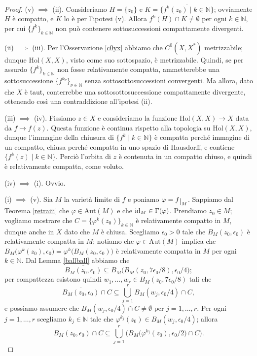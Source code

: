 \begin{proof}
    (v) $\implies$ (ii). Consideriamo $H=\{z_0\}$ e $K=\overline{\{f^k(z_0)\mid k\in\mathbb{N}\}}$; ovviamente $H$ è compatto, e $K$ lo è per l'ipotesi (v). Allora $f^k(H)\cap K\not=\emptyset$ per ogni $k\in\mathbb{N}$, per cui $\{f^k\}_{k \in \mathbb{N}}$ non può contenere sottosuccessioni compattamente divergenti.

    (ii) $\implies$ (iii). Per l'Osservazione \ref{c0yx} abbiamo che $C^0(X,X^*)$ metrizzabile; dunque $\text{Hol}(X,X)$, visto come suo sottospazio, è metrizzabile. Quindi, se per assurdo $\{f^k\}_{k \in \mathbb{N}}$ non fosse relativamente compatta, ammetterebbe una sottosuccessione $\{f^{k_\nu}\}_{\nu\in\mathbb{N}}$ senza sottosottosuccessioni convergenti. Ma allora, dato che $X$ è taut, conterrebbe una sottosottosuccessione compattamente divergente, ottenendo così una contraddizione all'ipotesi (ii).

    (iii) $\implies$ (iv). Fissiamo $z\in X$ e consideriamo la funzione $\text{Hol}(X,X)\longrightarrow X$ data da $f\longmapsto f(z)$. Questa funzione è continua rispetto alla topologia su $\text{Hol}(X,X)$, dunque l'immagine della chiusura di $\{f^k\mid k\in\mathbb{N}\}$ è compatta perché immagine di un compatto, chiusa perché compatta in uno spazio di Hausdorff, e contiene $\{f^k(z)\mid k\in\mathbb{N}\}$. Perciò l'orbita di $z$ è contenuta in un compatto chiuso, e quindi è relativamente compatta, come voluto.

    (iv) $\implies$ (i). Ovvio.

    (i) $\implies$ (v). Sia $M$ la varietà limite di $f$ e poniamo $\varphi=f\restrict{M}$. Sappiamo dal Teorema \ref{retraiii} che $\varphi\in\text{Aut}(M)$ e che $\operatorname{id}_M\in\Gamma(\varphi)$. Prendiamo $z_0 \in M$; vogliamo mostrare che $C=\{\varphi^k(z_0)\}_{k\in\mathbb{N}}$ è relativamente compatto in $M$, dunque anche in $X$ dato che $M$ è chiusa. Scegliamo $\epsilon_0>0$ tale che $B_M(z_0,\epsilon_0)$ è relativamente compatta in $M$; notiamo che $\varphi\in\text{Aut}(M)$ implica che $B_M\big(\varphi^k(z_0),\epsilon_0\big)=\varphi^k\big(B_M(z_0,\epsilon_0)\big)$ è relativamente compatta in $M$ per ogni $k \in \mathbb{N}$. Dal Lemma \ref{ballball} abbiamo che
    $$\overline{B_M(z_0,\epsilon_0)} \subseteq B_M\big(B_M(z_0,7\epsilon_0/8),\epsilon_0/4\big);$$
    per compattezza esistono quindi $w_1,\dots,w_r \in B_M(z_0,7\epsilon_0/8)$ tali che
    $$\overline{B_M(z_0,\epsilon_0)}\cap C\subseteq \bigcup_{j=1}^r B_M(w_j,\epsilon_0/4)\cap C,$$
    e possiamo assumere che $B_M(w_j,\epsilon_0/4)\cap C\not=\emptyset$ per $j=1,\dots,r$.
    Per ogni $j=1,\dots, r$ scegliamo $k_j\in\mathbb{N}$ tale che $\varphi^{k_j}(z_0)\in B_M(w_j,\epsilon_0/4)$; allora
    \begin{equation}\label{capci}
        B_M(z_0,\epsilon_0)\cap C \subseteq \bigcup_{j=1}^r \Big(B_M\big(\varphi^{k_j}(z_0),\epsilon_0/2\big)\cap C\Big).
    \end{equation}


\end{proof}
